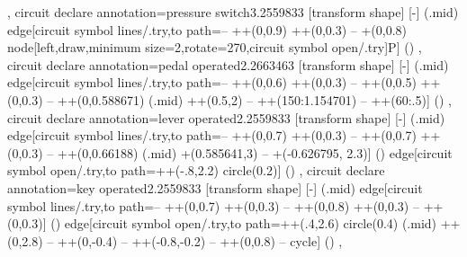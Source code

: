 {{  },
  circuit declare annotation={pressure switch}{3.2559833\tikzcircuitssizeunit}
  {
    [transform shape]
    [-]
    (\tikzlastnode.mid) edge[circuit symbol lines/.try,to path={-- ++(0,0.9\tikzcircuitssizeunit) ++(0,0.3\tikzcircuitssizeunit) -- +(0,0.8\tikzcircuitssizeunit) node[left,draw,minimum size=2\tikzcircuitssizeunit,rotate=270,circuit symbol open/.try]{P}}] ()
  },
  circuit declare annotation={pedal operated}{2.2663463\tikzcircuitssizeunit}
  {
    [transform shape]
    [-]
    (\tikzlastnode.mid) edge[circuit symbol lines/.try,to path={-- ++(0,0.6\tikzcircuitssizeunit) ++(0,0.3\tikzcircuitssizeunit) -- ++(0,0.5\tikzcircuitssizeunit)  ++(0,0.3\tikzcircuitssizeunit) -- ++(0,0.588671\tikzcircuitssizeunit) (\tikzlastnode.mid) ++(0.5\tikzcircuitssizeunit,2\tikzcircuitssizeunit) -- ++(150:1.154701\tikzcircuitssizeunit) -- ++(60:.5\tikzcircuitssizeunit)}] ()
  },
  circuit declare annotation={lever operated}{2.2559833\tikzcircuitssizeunit}
  {
    [transform shape]
    [-]
    (\tikzlastnode.mid) edge[circuit symbol lines/.try,to path={-- ++(0,0.7\tikzcircuitssizeunit) ++(0,0.3\tikzcircuitssizeunit) -- ++(0,0.7\tikzcircuitssizeunit)  ++(0,0.3\tikzcircuitssizeunit) -- ++(0,0.66188\tikzcircuitssizeunit) (\tikzlastnode.mid) +(0.585641\tikzcircuitssizeunit,3\tikzcircuitssizeunit) -- +(-0.626795\tikzcircuitssizeunit, 2.3\tikzcircuitssizeunit)}] () edge[circuit symbol open/.try,to path={++(-.8\tikzcircuitssizeunit,2.2\tikzcircuitssizeunit) circle(0.2\tikzcircuitssizeunit)}] ()
  },
  circuit declare annotation={key operated}{2.2559833\tikzcircuitssizeunit}
  {
    [transform shape]
    [-]
    (\tikzlastnode.mid) edge[circuit symbol lines/.try,to path={-- ++(0,0.7\tikzcircuitssizeunit) ++(0,0.3\tikzcircuitssizeunit) -- ++(0,0.8\tikzcircuitssizeunit) ++(0,0.3\tikzcircuitssizeunit) -- ++(0,0.3\tikzcircuitssizeunit)}] () edge[circuit symbol open/.try,to path={++(.4\tikzcircuitssizeunit,2.6\tikzcircuitssizeunit) circle(0.4\tikzcircuitssizeunit) (\tikzlastnode.mid) ++(0,2.8\tikzcircuitssizeunit) -- ++(0,-0.4\tikzcircuitssizeunit) -- ++(-0.8\tikzcircuitssizeunit,-0.2\tikzcircuitssizeunit) -- ++(0,0.8\tikzcircuitssizeunit) -- cycle}] ()
  },
}
